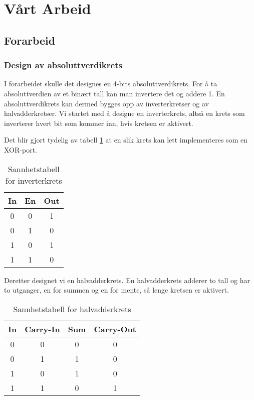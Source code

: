 \section{Vårt Arbeid}

\subsection{Forarbeid}

\subsubsection{Design av absoluttverdikrets}

I forarbeidet skulle det designes en 4-bits absoluttverdikrets.
For å ta absoluttverdien av et binært tall kan man invertere det og addere 1.
En absoluttverdikrets kan dermed bygges opp av inverterkretser og av halvadderkretser.
Vi startet med å designe en inverterkrets, altså en krets som inverterer hvert bit som kommer inn, hvis kretsen er aktivert.

Det blir gjort tydelig av tabell \ref{tabell:1} at en slik krets kan lett implementeres som en XOR-port.

\begin{table}[h]
  \centering
  \begin{tabular}{c c|c}

    In & En & Out\\
    \hline
    0 & 0 & 1\\
    0 & 1 & 0\\
    1 & 0 & 1\\
    1 & 1 & 0\\

  \end{tabular}
  \caption{Sannhetstabell for inverterkrets}
  \label{tabell:1}
\end{table}


Deretter designet vi en halvadderkrets. En halvadderkrets adderer to tall og har to utganger, en for summen og en for mente, så lenge kretsen er aktivert.

\begin{table}[h]
  \centering
  \begin{tabular}{c c|c|c}

    In & Carry-In & Sum & Carry-Out\\
    \hline
    0 & 0 & 0 & 0\\
    0 & 1 & 1 & 0\\
    1 & 0 & 1 & 0\\
    1 & 1 & 0 & 1\\

  \end{tabular}
  \caption{Sannhetstabell for halvadderkrets}
  \label{tabell:2}
\end{table}

